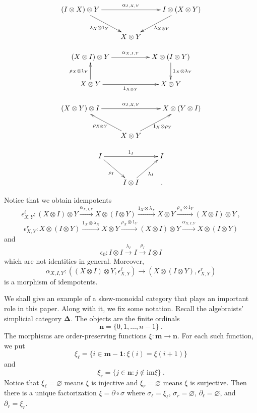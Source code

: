 \documentclass[a4paper,12pt,reqno]{amsart}
\theoremstyle{definition}
\theoremstyle{fact}
\theoremstyle{genquest}
\theoremstyle{step}
\newcommand{\lra}{\longrightarrow}
\begin{document}
\begin{equation}\label{leftunit}
\xymatrix{
(I\otimes X)\otimes Y \ar[rd]_{\lambda_{X} \otimes 1_Y}\ar[rr]^{\alpha_{I,X,Y}}   && I\otimes (X\otimes Y) \ar[ld]^{\lambda_{X\otimes Y}} \\
& X\otimes Y  &
}
\end{equation}

\begin{equation}\label{midunit}
\xymatrix{
(X\otimes I)\otimes Y \ar[rr]^-{\alpha_{X,I,Y}} && X\otimes (I\otimes Y) \ar[d]^-{1_X\otimes \lambda_Y} \\
X\otimes Y \ar[u]^-{\rho_X \otimes 1_Y} \ar[rr]_-{1_{X\otimes Y}} && X\otimes Y}
\end{equation}

\begin{equation}\label{rightunit}
\xymatrix{
(X\otimes Y)\otimes I \ar[rr]^{\alpha_{I,X,Y}}   && X\otimes (Y\otimes I)  \\
& X\otimes Y \ar[lu]^{\rho_{X \otimes Y}}  \ar[ru]_{1_X\otimes \rho_Y}&
}
\end{equation}

\begin{equation}\label{unitunit}
\xymatrix{
I \ar[rd]_{\rho_I}\ar[rr]^{1_I}   && I  \\
& I\otimes I \ar[ru]_{\lambda_I} & .
}
\end{equation}

Notice that we obtain idempotents
$$\epsilon^{\ell}_{X,Y} : (X\otimes I) \otimes Y \stackrel{\alpha_{X,I,Y}} \lra X\otimes (I \otimes Y)
\stackrel{1_X \otimes \lambda_X} \lra X\otimes Y
\stackrel{\rho_X \otimes 1_Y} \lra (X\otimes I)\otimes Y \ ,$$
$$\epsilon^{r}_{X,Y} : X\otimes (I \otimes Y) \stackrel{1_X \otimes \lambda_X} \lra X\otimes Y
\stackrel{\rho_X \otimes 1_Y} \lra (X\otimes I)\otimes Y \stackrel{\alpha_{X,I,Y}} \lra X\otimes (I \otimes Y)$$
and
$$\epsilon_0 : I\otimes I \stackrel{\lambda_I} \lra I \stackrel{\rho_I}\lra I\otimes I $$
which are not identities in general. Moreover, 
$$\alpha_{X,I,Y} : ((X\otimes I) \otimes Y, \epsilon^{\ell}_{X,Y}) \lra (X\otimes (I \otimes Y), \epsilon^{r}_{X,Y})$$
is a morphism of idempotents. 

We shall give an example of a skew-monoidal category that plays an important role in this paper.
Along with it, we fix some notation.
Recall the algebraists' simplicial category $\mathbf{\Delta}$.
The objects are the finite ordinals $$\mathbf{n} = \{0,1,\dots ,n-1\} \ .$$
The morphisms are order-preserving functions $\xi : \mathbf{m} \lra \mathbf{n}$. 
For each such function, we put
$$\xi_{\ell} = \{i\in \mathbf{m-1} : \xi (i) = \xi (i+1)\}$$
and
$$\xi_{r} = \{j \in \mathbf{n} : j \notin \mathrm{im} \xi \} \ .$$
Notice that $\xi_{\ell} =\varnothing$ means $\xi$ is injective and $\xi_{r} =\varnothing$ means $\xi$ is surjective. 
Then there is a unique factorization $\xi = \partial \circ \sigma$ where 
$\sigma_{\ell} = \xi_{\ell}$, $\sigma_{r} = \varnothing$, $\partial_{\ell} = \varnothing$, and $\partial_{r} = \xi_r$.  
\end{document}
